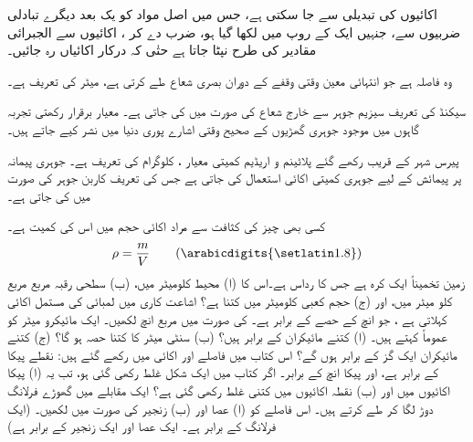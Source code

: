 اکائیوں کی تبدیلی   سے  جا سکتی ہے، جس میں اصل مواد   کو یک بعد دیگرے تبادلی ضربیوں  سے، جنہیں  ایک  کے روپ میں لکھا گیا ہو، ضرب دے  کر ، اکائیوں سے الجبرائی مقادیر  کی طرح  نپٹا جاتا ہے حتٰی کہ درکار اکائیاں رہ جائیں۔

وہ فاصلہ ہے جو انتہائی معین وقتی وقفے  کے دوران  بصری شعاع    طے کرتی ہے، میٹر کی تعریف  ہے۔

سیکنڈ کی تعریف  سیزیم   جوہر سے خارج شعاع  کی صورت  میں کی جاتی ہے۔ معیار برقرار رکھتی  تجربہ  گاہوں میں موجود جوہری گھڑیوں کے  صحیح   وقتی اشارے پوری دنیا   میں نشر کیے جاتے ہیں۔

پیرس شہر کے قریب رکھے گئے  پلاٹینم  و  اریڈیم کمیتی معیار ،  کلوگرام  کی  تعریف  ہے۔ جوہری پیمانہ پر پیمائش کے لیے جوہری کمیتی  اکائی استعمال کی جاتی ہے جس کی تعریف کاربن    جوہر کی صورت میں کی جاتی ہے۔

کسی بھی چیز کی کثافت   سے مراد اکائی حجم میں اس کی کمیت ہے۔ 
\begin{align*}
\rho=\frac{m}{V} \tag{\arabicdigits{\setlatin1.8}}
\end{align*}
زمین تخمیناً ایک کرہ  ہے جس کا رداس    ہے۔اس کا   (ا)  محیط کلومیٹر میں،  (ب)  سطحی رقبہ مربع   مربع کلو میٹر میں،  اور  (ج) حجم  کعبی کلومیٹر  میں کتنا ہے؟ 
اشاعت کاری میں لمبائی کی مستمل اکائی کہلاتی  ہے  ،  جو  انچ کے    حصے کے برابر  ہے۔ کی صورت میں  مربع انچ  لکھیں۔ 
ایک مائیکرو میٹر    کو عموماً  کہتے ہیں۔  (ا) کتنے مائیکران    کے برابر ہیں؟ (ب) سنٹی میٹر کا کتنا حصہ   ہو گا؟  (ج) کتنے مائیکران ایک گز کے برابر ہوں گے؟
اس کتاب میں فاصلے  اور  اکائی میں رکھے گئے ہیں:  نقطے  پیکا کے برابر ہے، اور   پیکا     انچ کے برابر۔  اگر کتاب میں ایک
 شکل    غلط رکھی گئی ہو، تب یہ  (ا) پیکا اکائیوں میں اور  (ب) نقطہ اکائیوں میں کتنی غلط رکھی گئی ہے؟ 
ایک مقابلے میں گھوڑے   فرلانگ  دوڑ لگا کر طے کرتے ہیں۔ اس فاصلے کو  (ا) عصا  اور  (ب) زنجیر  کی صورت میں لکھیں۔ (ایک فرلانگ  کے برابر ہے۔ ایک عصا  اور ایک زنجیر  کے برابر ہے)


